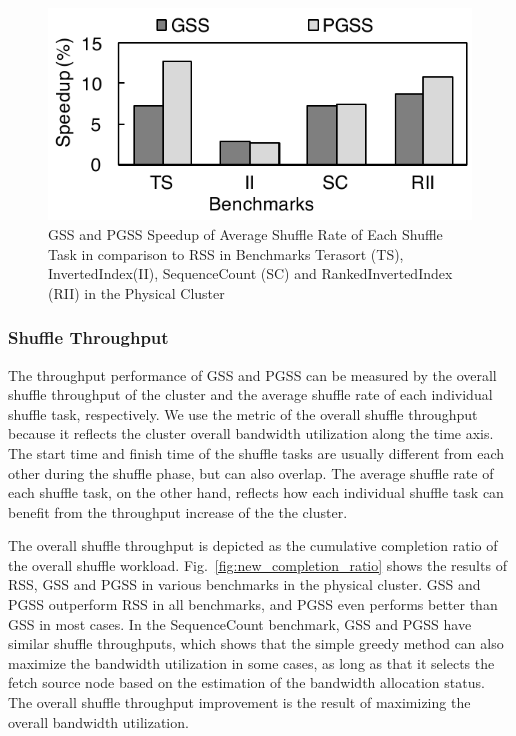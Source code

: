 \documentclass[10pt,journal,compsoc]{IEEEtran}
\begin{document}
\begin{figure}
\centering
\includegraphics[width=0.7\columnwidth,height=0.35\columnwidth]{figure6}
\caption{GSS and PGSS Speedup of Average Shuffle Rate of Each Shuffle Task in comparison to RSS in Benchmarks Terasort (TS), InvertedIndex(II), SequenceCount (SC) and RankedInvertedIndex (RII) in the Physical Cluster} 
\label{fig:new_shuffle_rate}
\end{figure}

\subsubsection{Shuffle Throughput}
The throughput performance of GSS and PGSS can be measured by the overall shuffle
throughput of the cluster
and the average shuffle rate of each individual shuffle task, respectively. 
We use the metric of the overall shuffle throughput because it
reflects the cluster overall bandwidth utilization along the time axis.
The start time and finish time of the shuffle tasks are usually different from each other during the shuffle phase, but can also overlap. 
The average shuffle rate of each shuffle task, on the other hand, reflects how each individual shuffle task can benefit from the throughput increase of the the cluster.

The overall shuffle throughput is depicted as the cumulative
completion ratio of the overall shuffle workload.
Fig.~\ref{fig:new_completion_ratio} shows the results of RSS, GSS
and PGSS in various benchmarks in the physical cluster.
GSS and PGSS outperform RSS in all benchmarks, 
and PGSS even performs better than GSS in most cases. 
In the SequenceCount benchmark, GSS and PGSS have similar shuffle
throughputs, %
which shows that the simple greedy method can also maximize the
bandwidth utilization in some cases,
as long as that it selects the fetch source node based on the estimation of the bandwidth allocation status. 
The overall shuffle throughput improvement is the result of maximizing
the overall bandwidth utilization.
\end{document}
